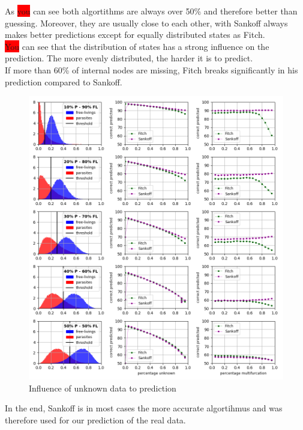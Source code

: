       As \colorbox{red}{you} can see both algortithms are always over 50\% and therefore better than guessing. Moreover, 
        they are usually close to each other, with Sankoff always makes better predictions except for 
        equally distributed states as Fitch. \\
      \colorbox{red}{You} can see that the distribution of states has a strong influence on the prediction. The more 
        evenly distributed, the harder it is to predict. \\
      If more than 60\% of internal nodes are missing, Fitch breaks significantly in his prediction 
        compared to Sankoff.
      
      \begin{figure}
        \centering
        \includegraphics[trim = 0mm 0mm 0mm 0mm, clip, width=\textwidth]{Figures/simulation_evaluation_1.png}
        \caption{Influence of unknown data to prediction}
        \label{fig:influence of unknown data}
      \end{figure}

      In the end, Sankoff is in most cases the more accurate algortihmus and was therefore used for our 
        prediction of the real data.

